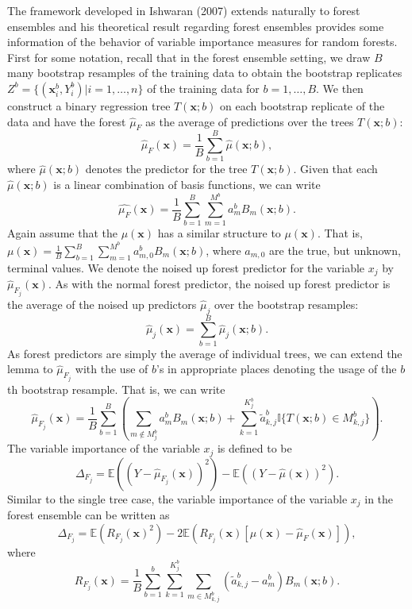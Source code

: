 \documentclass[12pt,twoside]{reedthesis}
\theoremstyle{definition}
\theoremstyle{definition}
\theoremstyle{definition}
\theoremstyle{remark}
\begin{document}
The framework developed in Ishwaran (2007) extends naturally to forest
ensembles and his theoretical result regarding forest ensembles provides
some information of the behavior of variable importance measures for
random forests. First for some notation, recall that in the forest
ensemble setting, we draw \(B\) many bootstrap resamples of the training
data to obtain the bootstrap replicates
\(Z^{b}=\{(\mathbf{x}_i^b, Y_i^b)|i=1,\ldots,n\}\) of the training data
for \(b=1,\ldots, B\). We then construct a binary regression tree
\(T(\mathbf{x};b)\) on each bootstrap replicate of the data and have the
forest \(\hat{\mu}_F\) as the average of predictions over the trees
\(T(\mathbf{x};b)\):
\[\hat{\mu}_F(\mathbf{x})=\frac{1}{B}\sum_{b=1}^B \hat{\mu}(\mathbf{x};b),\]
where \(\hat{\mu}(\mathbf{x};b)\) denotes the predictor for the tree
\(T(\mathbf{x};b)\). Given that each \(\hat{\mu}(\mathbf{x};b)\) is a
linear combination of basis functions, we can write
\[\hat{\mu_F}(\mathbf{x})=\frac{1}{B}\sum_{b=1}^B\sum_{m=1}^{M^b}a_m^b B_m(\mathbf{x};b).\]
Again assume that the \(\mu(\mathbf{x})\) has a similar structure to
\(\mu(\mathbf{x})\). That is,
\(\mu(\mathbf{x})=\frac{1}{B}\sum_{b=1}^B\sum_{m=1}^{M^b}a_{m,0}^b B_m(\mathbf{x};b)\),
where \(a_{m,0}\) are the true, but unknown, terminal values. We denote
the noised up forest predictor for the variable \(x_j\) by
\(\hat{\mu}_{F_j}(\mathbf{x})\). As with the normal forest predictor,
the noised up forest predictor is the average of the noised up
predictors \(\hat{\mu}_j\) over the bootstrap resamples:
\[\hat{\mu}_j(\mathbf{x})=\sum_{b=1}^B \hat{\mu}_j(\mathbf{x};b).\] As
forest predictors are simply the average of individual trees, we can
extend the lemma to \(\hat{\mu}_{F_j}\) with the use of \(b\)'s in
appropriate places denoting the usage of the \(b\)th bootstrap resample.
That is, we can write
\[\hat{\mu}_{F_j}(\mathbf{x})=\frac{1}{B}\sum_{b=1}^B\left(\sum_{m\notin M_j^b} a_m^b B_m(\mathbf{x};b)+\sum_{k=1}^{K_j^b} \tilde{a}_{k,j}^b \mathbb{I}\{T(\mathbf{x};b)\in M_{k,j}^b\} \right).\]
The variable importance of the variable \(x_j\) is defined to be
\[\Delta_{F_j}=\mathbb{E}((Y-\hat{\mu}_{F_j}(\mathbf{x}))^2)-\mathbb{E}((Y-\hat{\mu}(\mathbf{x}))^2).\]
Similar to the single tree case, the variable importance of the variable
\(x_j\) in the forest ensemble can be written as
\[\Delta_{F_j}=\mathbb{E}(R_{F_j}(\mathbf{x})^2)-2\mathbb{E}\left(R_{F_j}(\mathbf{x})[\mu(\mathbf{x})-\hat{\mu}_F(\mathbf{x})]\right),\]
where
\[R_{F_j}(\mathbf{x})=\frac{1}{B}\sum_{b=1}^b\sum_{k=1}^{K_j^b} \sum_{m\in M_{k,j}^b} (\tilde{a}_{k,j}^b-a_m^b)B_m(\mathbf{x}; b).\]
\end{document}
